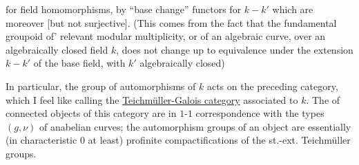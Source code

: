 for field homomorphisms, by ``base change'' functors
for $k\mathbin{-}k'$
which are moreover   [but
not  surjective]. (This comes
from the fact that the fundamental groupoid
of'   relevant modular multiplicity,
or of an algebraic curve, over an algebraically
closed field $k$, does not change up to equivalence
under the extension $k\mathbin{-}k'$ of the base field,
with $k'$ algebraically closed) 

In particular, the group of automorphisms
of $k$ acts on the preceding category,
which I feel like calling the \uline{Teichmüller-Galois
category} associated to $k$. The
  of connected objects of this
category are in $1$-$1$ correspondence with the types
$(g,\nu)$ of anabelian curves; the
automorphism groups of an object are essentially
(in characteristic $0$ at least) profinite compactifications
of the st.-ext. Teichmüller groups.
